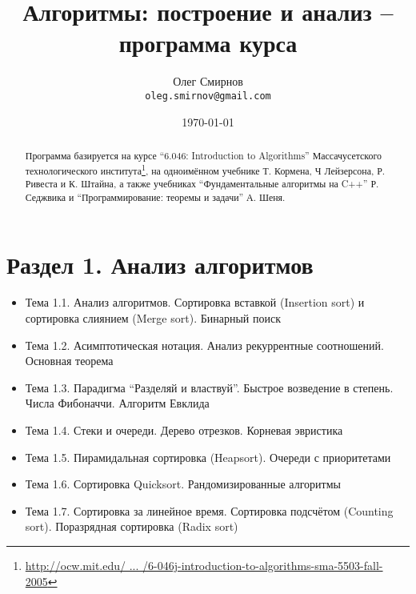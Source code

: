 \documentclass[a4paper,11pt]{article}
\author{Олег Смирнов\\
\texttt{oleg.smirnov@gmail.com}}
\date{\today}
\title{Алгоритмы: построение и анализ -- программа курса}
\begin{document}
\maketitle
\begin{abstract}
Программа базируется на курсе ``6.046: Introduction to Algorithms'' Массачусетского
технологического института\footnote{\href{http://goo.gl/jIOiq}
{http://ocw.mit.edu/ ... /6-046j-introduction-to-algorithms-sma-5503-fall-2005}}, 
на одноимённом учебнике Т. Кормена, Ч Лейзерсона, Р. Ривеста и К. Штайна, а также
учебниках ``Фундаментальные алгоритмы на C++'' Р. Седжвика и ``Программирование: теоремы
и задачи'' А. Шеня.
\end{abstract}
\section*{Раздел 1. Анализ алгоритмов}
\begin{itemize}
\item Тема 1.1. Анализ алгоритмов. Сортировка вставкой (Insertion sort) и сортировка слиянием (Merge sort). Бинарный поиск
\item Тема 1.2. Асимптотическая нотация. Анализ рекуррентные соотношений. Основная теорема
\item Тема 1.3. Парадигма ``Разделяй и властвуй''. Быстрое возведение в степень. Числа Фибоначчи. Алгоритм Евклида
\item Тема 1.4. Стеки и очереди. Дерево отрезков. Корневая эвристика
\item Тема 1.5. Пирамидальная сортировка (Heapsort). Очереди с приоритетами
\item Тема 1.6. Сортировка Quicksort. Рандомизированные алгоритмы
\item Тема 1.7. Сортировка за линейное время. Сортировка подсчётом (Counting sort). Поразрядная сортировка (Radix sort)
\end{itemize}
\end{document}
